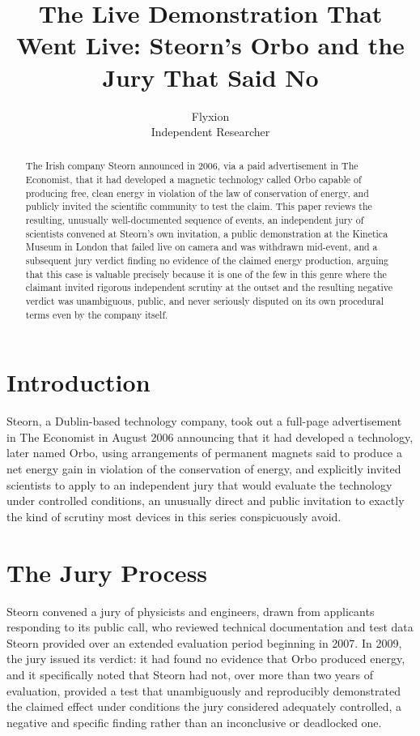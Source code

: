 \documentclass[11pt]{article}
\title{The Live Demonstration That Went Live: Steorn's Orbo and the Jury That Said No}
\author{Flyxion \\ \small Independent Researcher}
\date{}
\begin{document}
\maketitle

\begin{abstract}
The Irish company Steorn announced in 2006, via a paid advertisement in The Economist, that it had developed a magnetic technology called Orbo capable of producing free, clean energy in violation of the law of conservation of energy, and publicly invited the scientific community to test the claim. This paper reviews the resulting, unusually well-documented sequence of events, an independent jury of scientists convened at Steorn's own invitation, a public demonstration at the Kinetica Museum in London that failed live on camera and was withdrawn mid-event, and a subsequent jury verdict finding no evidence of the claimed energy production, arguing that this case is valuable precisely because it is one of the few in this genre where the claimant invited rigorous independent scrutiny at the outset and the resulting negative verdict was unambiguous, public, and never seriously disputed on its own procedural terms even by the company itself.
\end{abstract}

\section{Introduction}

Steorn, a Dublin-based technology company, took out a full-page advertisement in The Economist in August 2006 announcing that it had developed a technology, later named Orbo, using arrangements of permanent magnets said to produce a net energy gain in violation of the conservation of energy, and explicitly invited scientists to apply to an independent jury that would evaluate the technology under controlled conditions, an unusually direct and public invitation to exactly the kind of scrutiny most devices in this series conspicuously avoid.

\section{The Jury Process}

Steorn convened a jury of physicists and engineers, drawn from applicants responding to its public call, who reviewed technical documentation and test data Steorn provided over an extended evaluation period beginning in 2007. In 2009, the jury issued its verdict: it had found no evidence that Orbo produced energy, and it specifically noted that Steorn had not, over more than two years of evaluation, provided a test that unambiguously and reproducibly demonstrated the claimed effect under conditions the jury considered adequately controlled, a negative and specific finding rather than an inconclusive or deadlocked one.
\end{document}
